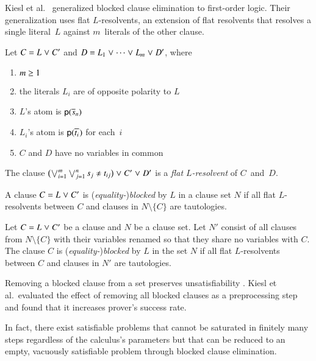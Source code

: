 Kiesl et al.\ \cite{ksstb-2017-blockedfol} generalized blocked clause
elimination to first-order logic. Their generalization uses flat
$L$-resolvents, an extension of flat resolvents that resolves a single
literal~$L$ against $m$~literals of the other clause.

\begin{defi}
   Let $C = L \mathrel{\lor} C'$ and $D = L_1 \mathrel{\lor} \cdots \mathrel{\lor} L_m \mathrel{\lor} D'$, where
   \begin{enumerate}
      \item $m \ge\nobreak 1$
      \item the literals $L_i$ are of opposite polarity to $L$
      \item $L$'s atom is $\mathsf{p}(\overline{s}_{n})$
      \item $L_i$'s atom is $\mathsf{p}(\overline{t_i}_{})$ for each~$i$
      \item $C$ and $D$ have no variables in common
   \end{enumerate}
   The clause
   $\bigl(\bigvee_{i=1}^m \bigvee_{j=1}^n
     \neqlit{s_j}{t_{ij}}\bigr) \cor C' \cor D'$
   is a \emph{flat $L$-resolvent} of $C$~and~$D$.
\end{defi}

\begin{defi}
   \label{def:equality-blocked}
   \begin{conf}%
      A clause $C = L \mathrel{\lor} C'$ is (\emph{equality-})\emph{blocked} by $L$ in a clause
      set $N$ if all flat $L$-resolvents between $C$ and clauses in $N \setminus \{C\}$ are
      tautologies.
   \end{conf}%
   \begin{rep}%
      Let $C = L \mathrel{\lor} C'$ be a clause and $N$ be a clause set.
      Let $N'$ consist of all clauses from $N \setminus \{C\}$ with their variables
      renamed so that they share no variables with $C$.
      The clause $C$ is (\emph{equality-})\emph{blocked} by $L$ in the set $N$ if
      all flat $L$-resolvents between $C$ and clauses in $N'$ are tautologies.
   \end{rep}
\end{defi}

Removing a blocked clause from a set preserves unsatisfiability
\cite{ksstb-2017-blockedfol}. Kiesl et al.\ evaluated the effect of removing all
blocked clauses as a preprocessing step and found that it increases
prover's success rate.

In fact, there exist satisfiable problems that cannot be saturated in finitely
many steps regardless of the calculus's parameters but that can be reduced to
an empty, vacuously satisfiable problem through blocked clause elimination.

